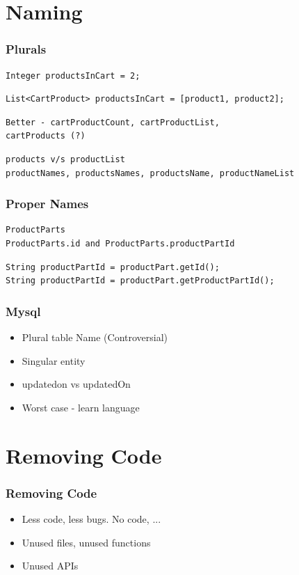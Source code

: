 \documentclass{beamer}
\begin{document}
\section{Naming}
\begin{frame}[fragile]
\frametitle{Plurals}
\begin{verbatim}
Integer productsInCart = 2;
\end{verbatim}
\pause
\begin{verbatim}
List<CartProduct> productsInCart = [product1, product2];
\end{verbatim}
\pause
\begin{verbatim}
Better - cartProductCount, cartProductList, 
cartProducts (?)
\end{verbatim}
\pause
\begin{verbatim}
products v/s productList
productNames, productsNames, productsName, productNameList 
\end{verbatim}
\end{frame}

\begin{frame}[fragile]
\frametitle{Proper Names}
\footnotesize
\begin{verbatim}
ProductParts
ProductParts.id and ProductParts.productPartId
\end{verbatim}
\pause
\begin{verbatim}
String productPartId = productPart.getId();
String productPartId = productPart.getProductPartId();
\end{verbatim}
\normalsize
\end{frame}

\begin{frame}[fragile]
\frametitle{Mysql}
\begin{itemize}
	\item Plural table Name (Controversial)
	\item Singular entity
	\item updated\textunderscore on vs updatedOn
	\item Worst case - learn language
\end{itemize}
\end{frame}

\section{Removing Code}
\begin{frame}[fragile]
\frametitle{Removing Code}
\begin{itemize}
	\item Less code, less bugs. No code, ...
	\pause
	\item Unused files, unused functions
	\pause
	\item Unused APIs
\end{itemize}
\end{frame}
\end{document}
